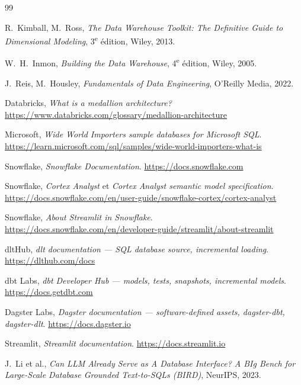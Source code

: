 \begin{thebibliography}{99}

R.~Kimball, M.~Ross, \emph{The Data Warehouse Toolkit: The Definitive Guide to Dimensional Modeling},
3\textsuperscript{e} édition, Wiley, 2013.

W.~H.~Inmon, \emph{Building the Data Warehouse}, 4\textsuperscript{e} édition, Wiley, 2005.

J.~Reis, M.~Housley, \emph{Fundamentals of Data Engineering}, O'Reilly Media, 2022.

Databricks, \emph{What is a medallion architecture?}
\url{https://www.databricks.com/glossary/medallion-architecture}

Microsoft, \emph{Wide World Importers sample databases for Microsoft SQL}.
\url{https://learn.microsoft.com/sql/samples/wide-world-importers-what-is}

Snowflake, \emph{Snowflake Documentation}. \url{https://docs.snowflake.com}

Snowflake, \emph{Cortex Analyst} et \emph{Cortex Analyst semantic model specification}.
\url{https://docs.snowflake.com/en/user-guide/snowflake-cortex/cortex-analyst}

Snowflake, \emph{About Streamlit in Snowflake}.
\url{https://docs.snowflake.com/en/developer-guide/streamlit/about-streamlit}

dltHub, \emph{dlt documentation --- SQL database source, incremental loading}.
\url{https://dlthub.com/docs}

dbt Labs, \emph{dbt Developer Hub --- models, tests, snapshots, incremental models}.
\url{https://docs.getdbt.com}

Dagster Labs, \emph{Dagster documentation --- software-defined assets, dagster-dbt, dagster-dlt}.
\url{https://docs.dagster.io}

Streamlit, \emph{Streamlit documentation}. \url{https://docs.streamlit.io}

J.~Li et al., \emph{Can LLM Already Serve as A Database Interface? A BIg Bench for Large-Scale
Database Grounded Text-to-SQLs (BIRD)}, NeurIPS, 2023.

\end{thebibliography}
